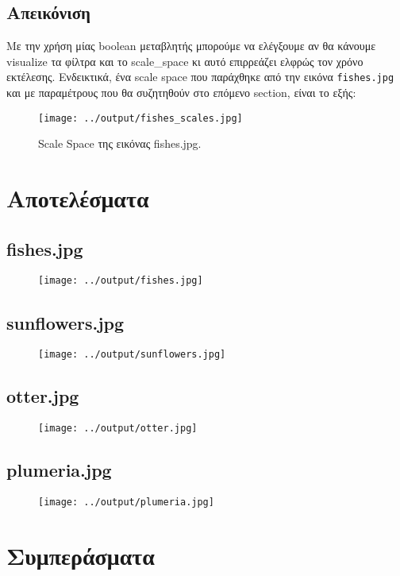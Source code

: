 \documentclass[11pt]{scrartcl} %
\begin{document}
\subsection{Απεικόνιση}

Με την χρήση μίας boolean μεταβλητής μπορούμε να ελέγξουμε αν θα κάνουμε visualize τα φίλτρα και το scale\_space κι αυτό επιρρεάζει
ελφρώς τον χρόνο εκτέλεσης. Ενδεικτικά, ένα scale space που παράχθηκε από την εικόνα \texttt{fishes.jpg} και με παραμέτρους που θα
συζητηθούν στο επόμενο section, είναι το εξής:

\begin{figure}[H]
  \centerline{\texttt{[image: ../output/fishes\_scales.jpg]}}
  \caption{Scale Space της εικόνας fishes.jpg.}
\end{figure}

\section{Αποτελέσματα}

\subsection{fishes.jpg}
\begin{figure}[H]
  \centerline{\texttt{[image: ../output/fishes.jpg]}}
  \caption{}
\end{figure}

\subsection{sunflowers.jpg}
\begin{figure}[H]
  \centerline{\texttt{[image: ../output/sunflowers.jpg]}}
  \caption{}
\end{figure}

\subsection{otter.jpg}
\begin{figure}[H]
  \centerline{\texttt{[image: ../output/otter.jpg]}}
  \caption{}
\end{figure}

\subsection{plumeria.jpg}
\begin{figure}[H]
  \centerline{\texttt{[image: ../output/plumeria.jpg]}}
  \caption{}
\end{figure}

\section{Συμπεράσματα}
\end{document}

